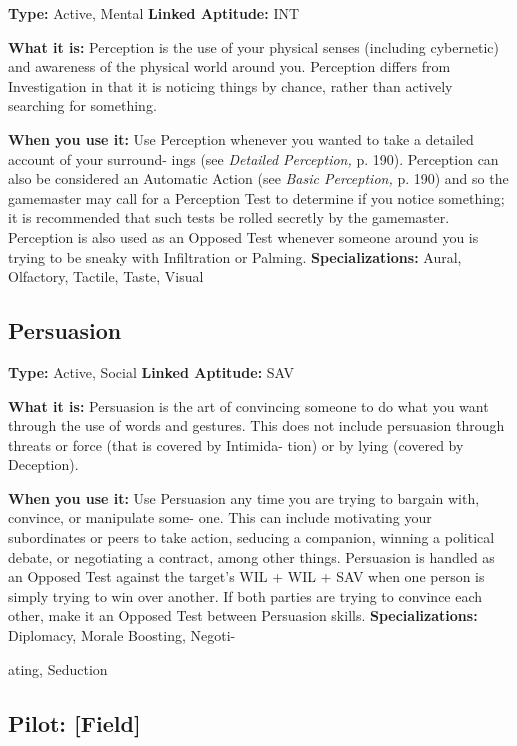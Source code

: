 \textbf{Type:} Active, Mental
\textbf{Linked Aptitude:} INT

\textbf{What it is:} Perception is the use of your physical 
senses (including cybernetic) and awareness of the 
physical world around you. Perception differs from 
Investigation in that it is noticing things by chance, 
rather than actively searching for something.

\textbf{When you use it:} Use Perception whenever you 
wanted to take a detailed account of your surround-
ings (see \textit{Detailed Perception,} p. 190). Perception 
can also be considered an Automatic Action (see 
\textit{Basic Perception, }p. 190) and so the gamemaster may 
call for a Perception Test to determine if you notice 
something; it is recommended that such tests be rolled 
secretly by the gamemaster. Perception is also used as 
an Opposed Test whenever someone around you is 
trying to be sneaky with Infiltration or Palming.
\textbf{Specializations:} Aural, Olfactory, Tactile, Taste, Visual

\subsection{Persuasion}

\textbf{Type:} Active, Social
\textbf{Linked Aptitude:} SAV

\textbf{What it is:} Persuasion is the art of convincing 
someone to do what you want through the use of 
words and gestures. This does not include persuasion 
through threats or force (that is covered by Intimida-
tion) or by lying (covered by Deception).

\textbf{When you use it:} Use Persuasion any time you are 
trying to bargain with, convince, or manipulate some-
one. This can include motivating your subordinates or 
peers to take action, seducing a companion, winning 
a political debate, or negotiating a contract, among 
other things. Persuasion is handled as an Opposed 
Test against the target's WIL + WIL + SAV when one 
person is simply trying to win over another. If both 
parties are trying to convince each other, make it an 
Opposed Test between Persuasion skills.
\textbf{Specializations:} Diplomacy, Morale Boosting, Negoti-

ating, Seduction

\subsection{Pilot: [Field]}

